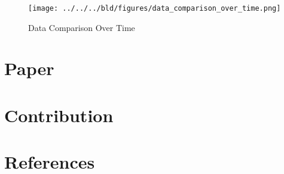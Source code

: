 \documentclass[11pt,a4paper,leqno]{article}
\begin{document}
\begin{figure}[!htbp]
	\texttt{[image: ../../../bld/figures/data\_comparison\_over\_time.png]}
  \caption{Data Comparison Over Time}
\label{fig:comp_over_time}
\end{figure}

\section{Paper}



\section{Contribution}

\section{References}

\printbibliography
\end{document}
